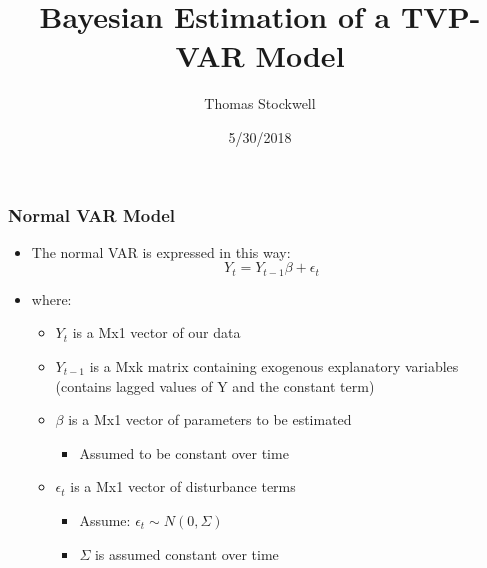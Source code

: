 \scshape\documentclass[xcolor=svgnames]{beamer}
\author{Thomas Stockwell \\ \textit{}}
\title{Bayesian Estimation of a TVP-VAR Model}
\date{5/30/2018}
\begin{document}
\frame{\titlepage}


\begin{frame}
\frametitle{Normal VAR Model}
\begin{itemize}
	\item  The normal VAR is expressed in this way:
	$$ Y_t =  Y_{t-1} \beta + \epsilon_t $$
	\item where:
	\begin{itemize}
		\item $Y_t$ is a Mx1 vector of our data
		\vspace{0.1 in}
		\item $Y_{t-1}$ is a Mxk matrix containing exogenous explanatory variables (contains lagged values of Y and the constant term)
		\vspace{0.1 in}
		\item $\beta$ is a Mx1 vector of parameters to be estimated
		\begin{itemize}
			\item Assumed to be constant over time
		\end{itemize}
		\vspace{0.1 in}
		\item $\epsilon_t$ is a Mx1 vector of disturbance terms
		\begin{itemize}
			\item Assume: $\epsilon_t \sim N(0,\Sigma)$ \
			\item $\Sigma$ is assumed constant over time
		\end{itemize}
	\end{itemize}
\end{itemize}
\end{frame}
\end{document}
